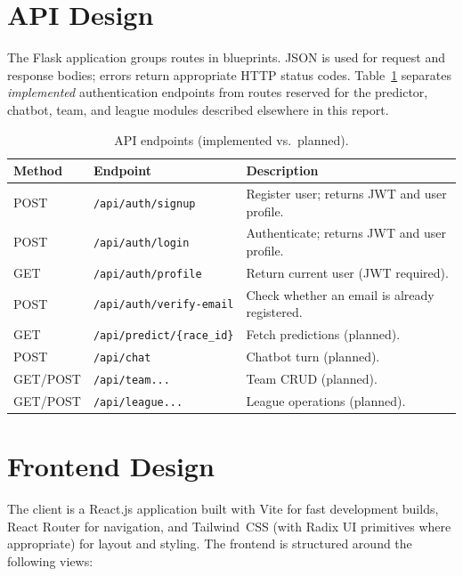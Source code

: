 \documentclass[12pt, a4paper, oneside]{report}
\begin{document}
\section{API Design}

The Flask application groups routes in blueprints. JSON is used for request and
response bodies; errors return appropriate HTTP status codes. Table~\ref{tab:api}
separates \emph{implemented} authentication endpoints from routes reserved for
the predictor, chatbot, team, and league modules described elsewhere in this
report.

\begin{table}[H]
\centering
\caption{API endpoints (implemented vs.\ planned).}
\label{tab:api}
\begin{tabularx}{\textwidth}{@{} l l X @{}}
  \toprule
  \textbf{Method} & \textbf{Endpoint} & \textbf{Description} \\
  \midrule
  POST & \texttt{/api/auth/signup}   & Register user; returns JWT and user profile. \\
  POST & \texttt{/api/auth/login}    & Authenticate; returns JWT and user profile. \\
  GET  & \texttt{/api/auth/profile} & Return current user (JWT required). \\
  POST & \texttt{/api/auth/verify-email} & Check whether an email is already registered. \\
  \midrule
  GET  & \texttt{/api/predict/\{race\_id\}} & Fetch predictions (planned). \\
  POST & \texttt{/api/chat}          & Chatbot turn (planned). \\
  GET/POST & \texttt{/api/team...}   & Team CRUD (planned). \\
  GET/POST & \texttt{/api/league...} & League operations (planned). \\
  \bottomrule
\end{tabularx}
\end{table}

\section{Frontend Design}

The client is a React.js application built with Vite for fast development builds,
React Router for navigation, and Tailwind~CSS (with Radix UI primitives where
appropriate) for layout and styling. The frontend is structured around the
following views:
\end{document}
